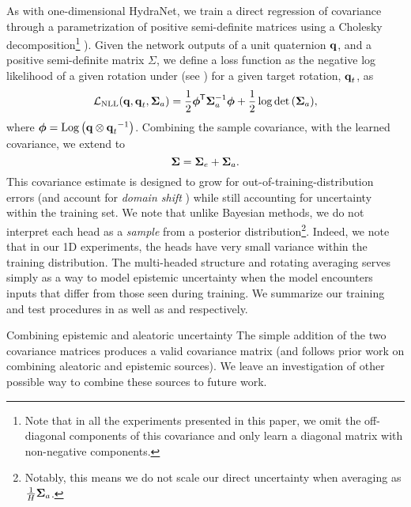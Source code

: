 As with one-dimensional HydraNet, we train a direct regression of covariance through a parametrization of positive semi-definite matrices using a Cholesky decomposition\footnote{Note that in all the experiments presented in this paper, we omit the off-diagonal components of this covariance and only learn a diagonal matrix with non-negative components.} \citep{Hu2015-uw,Haarnoja2016-ph}). Given the network outputs of a unit quaternion $\boldsymbol{\mathbf{q}}$, and a positive semi-definite matrix $\Sigma$, we define a loss function as the negative log likelihood of a given rotation under  (see \citep{Forster2015-af}) for a given target rotation, $\boldsymbol{\mathbf{q}}_t$, as
\begin{equation}
\label{eq:nll_loss}
\mathcal{L}_\mathrm{NLL}(\boldsymbol{\mathbf{q}}, \boldsymbol{\mathbf{q}}_t, \boldsymbol{\mathbf{\Sigma}}_a) = \frac{1}{2}\boldsymbol{\mathbf{\phi}}^{\mkern-1.0mu\mathsf{T}} \boldsymbol{\mathbf{\Sigma}}_a^{-1}\boldsymbol{\mathbf{\phi}} + \frac{1}{2} \log{ \mathrm{det}\left( \boldsymbol{\mathbf{\Sigma}} _a\right) },
\end{equation}
\noindent where  $\boldsymbol{\mathbf{\phi}} = \mathrm{Log}\left({\boldsymbol{\mathbf{q}} \otimes { \boldsymbol{\mathbf{q}} _t}^{-1}}\right)$. Combining the sample covariance, with the learned covariance, we extend  to
\begin{equation}
\boldsymbol{\mathbf{\Sigma}} = \boldsymbol{\mathbf{\Sigma}}_e + \boldsymbol{\mathbf{\Sigma}}_a.
\end{equation}
This covariance estimate is designed to grow for out-of-training-distribution errors (and account for \textit{domain shift} \citep{Lakshminarayanan2017}) while still accounting for uncertainty within the training set. We note that unlike Bayesian methods, we do not interpret each head as a \textit{sample} from a posterior distribution\footnote{Notably, this means we do not scale our direct uncertainty when averaging as $\frac{1}{H}\boldsymbol{\mathbf{\Sigma}}_a$.}. Indeed, we note that in our 1D experiments, the heads have very small variance within the training distribution. The multi-headed structure and rotating averaging serves simply as a way to model epistemic uncertainty when the model encounters inputs that differ from those seen during training. We summarize our training and test procedures in  as well as  and  respectively. 
\begin{remark}{Combining epistemic and aleatoric uncertainty}
	The simple addition of the two covariance matrices produces a valid covariance matrix (and follows prior work \cite{Kendall2017-vs} on combining aleatoric and epistemic sources). We leave an investigation of other possible way to combine these sources to future work.
\end{remark}

